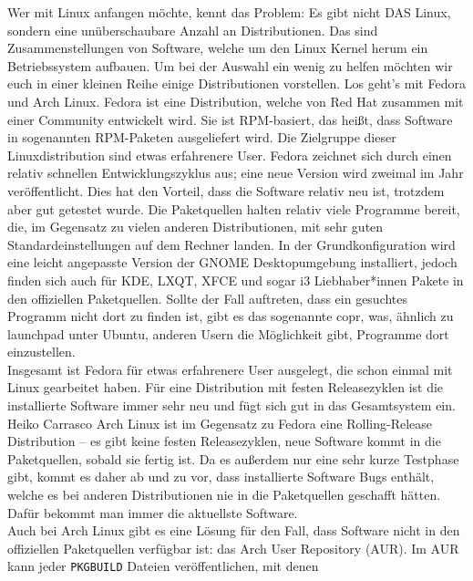 {Wer mit Linux anfangen möchte, kennt das Problem: Es gibt nicht DAS Linux,
sondern eine unüberschaubare Anzahl an Distributionen. Das sind
Zusammenstellungen von Software, welche um den Linux Kernel herum ein
Betriebssystem aufbauen. Um bei der Auswahl ein wenig zu helfen möchten wir
euch in einer kleinen Reihe einige Distributionen vorstellen. Los geht's mit Fedora und Arch Linux. }
{
{Fedora ist eine Distribution, welche von Red Hat zusammen mit einer Community
entwickelt wird. Sie ist RPM-basiert, das heißt, dass Software in sogenannten
RPM-Paketen ausgeliefert wird. Die Zielgruppe dieser Linuxdistribution sind
etwas erfahrenere User. Fedora zeichnet sich durch einen relativ schnellen
Entwicklungszyklus aus; eine neue Version wird zweimal im Jahr veröffentlicht.
Dies hat den Vorteil, dass die Software relativ neu ist, trotzdem aber gut
getestet wurde. Die Paketquellen halten relativ viele Programme bereit, die, im
Gegensatz zu vielen anderen Distributionen, mit sehr guten
Standardeinstellungen auf dem Rechner landen. In der Grundkonfiguration wird
eine leicht angepasste Version der GNOME Desktopumgebung installiert, jedoch
finden sich auch für KDE, LXQT, XFCE und sogar i3 Liebhaber*innen Pakete in den
offiziellen Paketquellen. Sollte der Fall auftreten, dass ein gesuchtes
Programm nicht dort zu finden ist, gibt es das sogenannte copr, was, ähnlich zu
launchpad unter Ubuntu, anderen Usern die Möglichkeit gibt, Programme dort
einzustellen.
\\
Insgesamt ist Fedora für etwas erfahrenere User ausgelegt, die schon einmal mit
Linux gearbeitet haben. Für eine Distribution mit festen Releasezyklen ist die
installierte Software immer sehr neu und fügt sich gut in das Gesamtsystem
ein.}
{Heiko Carrasco}
\vspace{3em}
{Arch Linux ist im Gegensatz zu Fedora eine Rolling-Release Distribution -- es
gibt keine festen Releasezyklen, neue Software kommt in die Paketquellen, sobald
sie fertig ist. Da es außerdem nur eine sehr kurze Testphase gibt, kommt es
daher ab und zu vor, dass installierte Software Bugs enthält, welche es bei
anderen Distributionen nie in die Paketquellen geschafft hätten. Dafür bekommt
man immer die aktuellste Software.\\
Auch bei Arch Linux gibt es eine Lösung für den Fall, dass Software nicht in den
offiziellen Paketquellen verfügbar ist: das Arch User Repository (AUR).
Im AUR kann jeder \texttt{PKGBUILD} Dateien veröffentlichen, mit denen
}}
